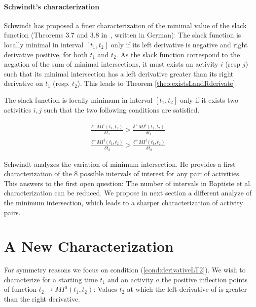 \documentclass{llncs}
\newcommand \MI[3]{MI^{#3}(#1,#2) }
\begin{document}
\paragraph{\bf Schwindt's characterization} Schwindt has proposed a finer characterization of the minimal value of the slack function (Theorems 3.7 and 3.8 in~\cite{schwindt98:PhD}, written in German):
The slack function is locally minimal in interval $[t_1,t_2]$ only if its left derivative is negative and  right derivative positive, for both $t_1$ and $t_2$.
As the slack function correspond to the negation of the sum of minimal intersections,
it must exists an activity $i$ (resp $j$) such that its minimal intersection has a left derivative greater than its right derivative on $t_1$ (resp. $t_2$). This leads to Theorem \ref{theo:existsLandRderivate}.

\begin{theorem}\label{theo:existsLandRderivate}
The slack function is locally minimum in interval $[t_1,t_2]$ only if it exists two activities $i,j$ such that the two following conditions are satisfied. 

\begin{align} 
\frac{\delta^- \MI{t_1}{t_2}{i}}{\delta t_1} > \frac{\delta^+ \MI{t_1}{t_2}{i}}{\delta t_1}  \label{cond:derivativeLT1}\\
\frac{\delta^- \MI{t_1}{t_2}{j}}{\delta t_2} > \frac{\delta^+ \MI{t_1}{t_2}{j}}{\delta t_2}  \label{cond:derivativeLT2}
\end{align} 
\end{theorem}

Schwindt analyzes the variation of minimum intersection. He provides a first characterization of the 8 possible intervals of interest for any pair of activities. 
This answers to the first open question: The number of intervals in Baptiste et al. characterization can be reduced.
We propose in next section a different analyze of the minimum intersection, which leads to a sharper characterization of activity pairs.

\section{A New Characterization}


For symmetry reasons we focus on condition (\ref{cond:derivativeLT2}).
We wish to characterize for a starting time $t_1$ and an activity $a$ the positive inflection points of function $t_2 \rightarrow \MI{t_1}{t_2}{a}$:
Values $t_2$ at which the left derivative of is greater than the right derivative.
\end{document}

